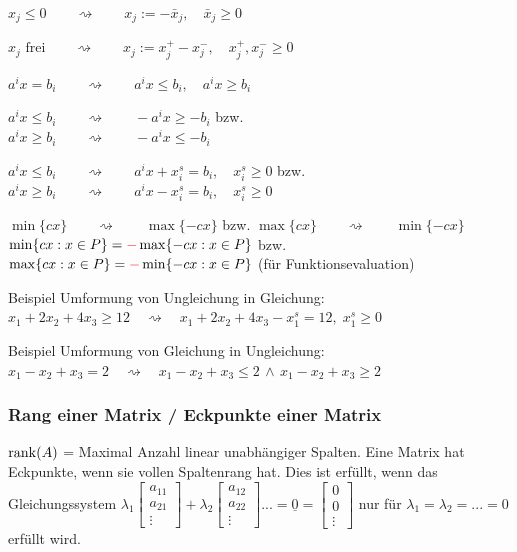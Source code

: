    \begin{aufzaehlung}
      \item $x_j \leq 0 \qquad \rightsquigarrow \qquad x_j := -\bar{x}_j, \quad \bar{x}_j \geq 0$
      \item $x_j \text{ frei} \qquad \rightsquigarrow \qquad x_j := x_j^+ - x_j^-, \quad x_j^+, x_j^- \geq 0$
      \item $a^i x = b_i \qquad \rightsquigarrow \qquad a^i x \leq b_i, \quad a^i x \geq b_i$
      \item $a^i x \leq b_i \qquad \rightsquigarrow \qquad -a^i x \geq -b_i$ bzw.\\
            $a^i x \geq b_i \qquad \rightsquigarrow \qquad -a^i x \leq -b_i$
      \item $a^i x \leq b_i \qquad \rightsquigarrow \qquad a^i x + x_i^s = b_i, \quad x_i^s \geq 0$ bzw.\\
            $a^i x \geq b_i \qquad \rightsquigarrow \qquad a^i x - x_i^s = b_i, \quad x_i^s \geq 0$
      \item $\min \{cx\} \qquad \rightsquigarrow \qquad \max \{-cx\}$ \qquad \qquad bzw. \qquad $\max \{cx\} \qquad \rightsquigarrow \qquad \min \{-cx\}$\newline
      $\min \{cx: x \in P\} = \textcolor{red}{-} \max \{-cx: x \in P\}$ \quad bzw. \quad $\max \{cx: x \in P\} = \textcolor{red}{-} \min \{-cx: x \in P\}$ (für Funktionsevaluation)
    \end{aufzaehlung}
  	
	
	Beispiel Umformung von Ungleichung in Gleichung: $x_1 + 2x_2 + 4x_3 \geq 12 \quad \rightsquigarrow \quad x_1 + 2x_2 + 4x_3 - x_1^s = 12, \; x_1^s \geq 0$
	
	Beispiel Umformung von Gleichung in Ungleichung: $x_1 - x_2 + x_3 = 2 \quad \rightsquigarrow \quad x_1 -x_2 + x_3 \leq 2\, \wedge \, x_1 - x_2 + x_3 \geq 2$
	
	\subsubsection{Rang einer Matrix / Eckpunkte einer Matrix}
	  $\operatorname{rank}(A)$ = Maximal Anzahl linear unabhängiger Spalten. Eine Matrix hat Eckpunkte, wenn sie vollen Spaltenrang hat. Dies ist erfüllt, wenn das Gleichungssystem $\lambda_1 \begin{bmatrix}
   	  a_{11}\\a_{21}\\ \vdots
 	  \end{bmatrix} + 
 	  \lambda_2\begin{bmatrix}
   	  a_{12}\\a_{22}\\ \vdots
 	  \end{bmatrix} ...
 	  = \underline{0} = \begin{bmatrix}
 	     	  0\\0\\ \vdots
 	  \end{bmatrix}$ nur für $\lambda_1 = \lambda_2 = ... = 0$ erfüllt wird.
 	  
